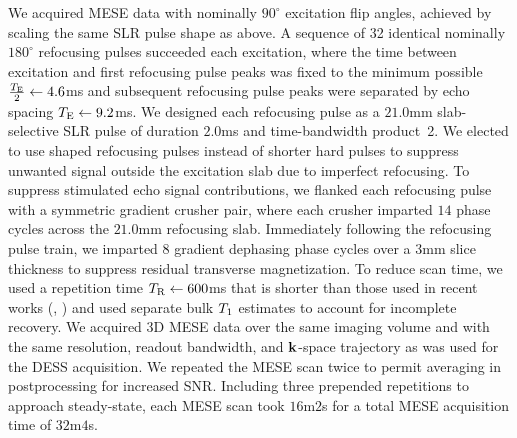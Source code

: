 We acquired MESE data
with nominally $90^\circ$ excitation flip angles,
achieved by scaling the same SLR pulse shape as above.
A sequence of 32 identical nominally $180^\circ$ refocusing pulses
succeeded each excitation,
where the time between excitation and first refocusing pulse peaks
was fixed to the minimum possible $\frac{T_\mathrm{E}}{2} \gets 4.6$ms
and subsequent refocusing pulse peaks were separated
by echo spacing $T_\mathrm{E} \gets 9.2$ms.
We designed each refocusing pulse
as a $21.0$mm slab-selective SLR pulse
of duration $2.0$ms 
and time-bandwidth product~2.
We elected to use shaped refocusing pulses
instead of shorter hard pulses
to suppress unwanted signal outside the excitation slab
due to imperfect refocusing.
To suppress stimulated echo signal contributions,
we flanked each refocusing pulse
with a symmetric gradient crusher pair,
where each crusher imparted $14$ phase cycles
across the $21.0$mm refocusing slab.
Immediately following the refocusing pulse train,
we imparted $8$ gradient dephasing phase cycles 
over a $3$mm slice thickness
to suppress residual transverse magnetization.
To reduce scan time,
we used a repetition time $T_\mathrm{R} \gets 600$ms
that is shorter than those used
in recent works (\eg, \cite{prasloski:12:rwc,zhang:15:com})
and used separate bulk $T_1$ estimates
to account for incomplete recovery.
We acquired 3D MESE data 
over the same imaging volume
and with the same resolution, readout bandwidth, and $\mathbf{k}$-space trajectory
as was used for the DESS acquisition.
We repeated the MESE scan twice
to permit averaging in postprocessing 
for increased SNR.
Including three prepended repetitions to approach steady-state,
each MESE scan took $16$m$2$s
for a total MESE acquisition time of $32$m$4$s.

